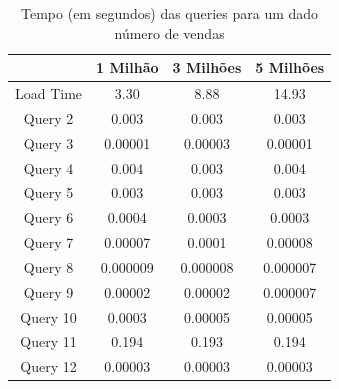 \documentclass[a4paper]{report}
\begin{document}
\begin{table}[H]
    \begin{center}
        \begin{tabular}{| c | c | c | c |}
            \hline
            & 1 Milhão & 3 Milhões & 5 Milhões \\
            \hline
            Load Time & 3.30 & 8.88 & 14.93 \\
            \hline
            Query 2 & 0.003 & 0.003 & 0.003 \\
            \hline
            Query 3 & 0.00001 & 0.00003 & 0.00001 \\
            \hline
            Query 4 & 0.004 & 0.003 & 0.004 \\
            \hline
            Query 5 & 0.003 & 0.003 & 0.003 \\
            \hline
            Query 6 & 0.0004 & 0.0003 & 0.0003 \\
            \hline
            Query 7 & 0.00007 & 0.0001 & 0.00008 \\
            \hline
            Query 8 & 0.000009 & 0.000008 & 0.000007 \\
            \hline
            Query 9 & 0.00002 & 0.00002 & 0.000007 \\
            \hline
            Query 10 & 0.0003 & 0.00005 & 0.00005 \\
            \hline
            Query 11 & 0.194 & 0.193 & 0.194 \\
            \hline
            Query 12 & 0.00003 & 0.00003 & 0.00003 \\
            \hline

        \end{tabular}
        \caption{Tempo (em segundos) das queries para um dado número de vendas}
        \label{tab:benches}
    \end{center}
\end{table}
\end{document}
